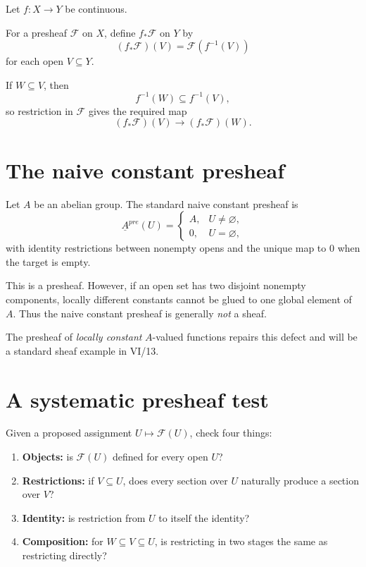 Let $f:X\to Y$ be continuous.

\begin{definition}
For a presheaf $\mathcal F$ on $X$, define $f_*\mathcal F$ on $Y$ by
\[
(f_*\mathcal F)(V)=\mathcal F(f^{-1}(V))
\]
for each open $V\subseteq Y$.
\end{definition}

If $W\subseteq V$, then
\[
f^{-1}(W)\subseteq f^{-1}(V),
\]
so restriction in $\mathcal F$ gives the required map
\[
(f_*\mathcal F)(V)\longrightarrow(f_*\mathcal F)(W).
\]



\section{The naive constant presheaf}

Let $A$ be an abelian group.  The standard naive constant presheaf is
\[
\underline{A}^{pre}(U)=
\begin{cases}
A,&U\neq\varnothing,\\
0,&U=\varnothing,
\end{cases}
\]
with identity restrictions between nonempty opens and the unique map to $0$ when the target
is empty.

This is a presheaf.  However, if an open set has two disjoint nonempty components, locally
different constants cannot be glued to one global element of $A$.  Thus the naive constant
presheaf is generally \emph{not} a sheaf.



The presheaf of \emph{locally constant} $A$-valued functions repairs this defect and will be
a standard sheaf example in VI/13.

\section{A systematic presheaf test}

Given a proposed assignment $U\mapsto\mathcal F(U)$, check four things:

\begin{enumerate}
\item \textbf{Objects:} is $\mathcal F(U)$ defined for every open $U$?
\item \textbf{Restrictions:} if $V\subseteq U$, does every section over $U$ naturally produce
      a section over $V$?
\item \textbf{Identity:} is restriction from $U$ to itself the identity?
\item \textbf{Composition:} for $W\subseteq V\subseteq U$, is restricting in two stages the
      same as restricting directly?
\end{enumerate}

